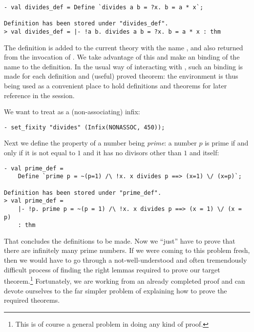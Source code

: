 \begin{session}
\begin{verbatim}
- val divides_def = Define `divides a b = ?x. b = a * x`;

Definition has been stored under "divides_def".
> val divides_def = |- !a b. divides a b = ?x. b = a * x : thm
\end{verbatim}
\end{session}

The definition is added to the current theory with the name
, and also returned from the invocation of
. We take advantage of this and make an \ML{} binding of
the name  to the definition. In the usual way of
interacting with \HOL, such an \ML{} binding is made for each
definition and (useful) proved theorem: the \ML{} environment is thus
being used as a convenient place to hold definitions and theorems for
later reference in the session.

We want to treat  as a (non-associating) infix:
\begin{session}
\begin{verbatim}
- set_fixity "divides" (Infix(NONASSOC, 450));
\end{verbatim}
\end{session}
Next we define the property of a number being \emph{prime}: a number $p$ is
prime if and only if it is not equal to $1$ and it has no divisors other
than $1$ and itself:

\begin{session}
\begin{verbatim}
- val prime_def =
    Define `prime p = ~(p=1) /\ !x. x divides p ==> (x=1) \/ (x=p)`;

Definition has been stored under "prime_def".
> val prime_def =
    |- !p. prime p = ~(p = 1) /\ !x. x divides p ==> (x = 1) \/ (x = p)
    : thm
\end{verbatim}
\end{session}

That concludes the definitions to be made. Now we ``just'' have to prove
that there are infinitely many prime numbers. If we were coming to this
problem fresh, then we would have to go through a not-well-understood
and often tremendously difficult process of finding the right lemmas
required to prove our target theorem.\footnote{This is of course a
general problem in doing any kind of proof.} Fortunately, we are working
from an already completed proof and can devote ourselves to the far
simpler problem of explaining how to prove the required theorems.

